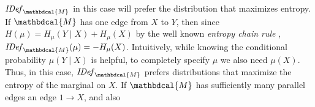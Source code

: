 \documentclass[letterpaper]{article} %
\theoremstyle{plain}
\theoremstyle{definition}
\theoremstyle{remark}
\let\H\relax
\DeclareMathOperator{\H}{\mathrm{H}} %
\newcommand{\dg}[1]{\mathbdcal{#1}}
\newcommand{\IDef}[1]{\mathit{IDef}_{#1}}
\begin{document}
$\IDef{\dg M}$ in this case will prefer the distribution that
maximizes entropy.
If $\dg M$ has one edge from $X$ to $Y$, then since
$H(\mu) = H_{\mu}(Y \mid X) + H_\mu(X)$ by the well known 
\emph{entropy chain rule} \cite{mackay2003information},
$\IDef{\dg   M}(\mu) = -H_{\mu}(X)$.
Intuitively, while knowing the conditional probability $\mu(Y \mid X)$
is helpful, to completely specify $\mu$ we also need 
$\mu(X)$.     Thus, in this case, $\IDef{\dg
  M}$ prefers distributions that maximize the entropy of 
the marginal on $X$.
If $\dg M$ has  
 sufficiently many parallel edges
an edge $1 \to X$, and also 
\end{document}
